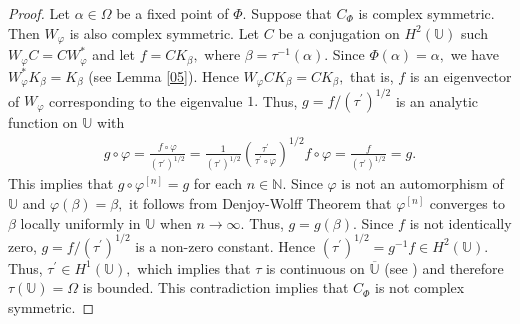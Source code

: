 \documentclass[11pt]{amsart}%
\theoremstyle{definition}
\theoremstyle{remark}
\numberwithin{equation}{section}
\begin{document}
\begin{proof}
Let $\alpha\in \Omega$ be a fixed point of $\Phi.$ Suppose that $C_{\Phi}$ is complex symmetric. Then
$W_{\varphi}$ is also complex symmetric. Let $C$ be a conjugation on
$H^{2}(\mathbb{U})$ such $W_{\varphi}C=CW_{\varphi}^{*}$ and let $f=CK_{\beta},$
where $\beta=\tau^{-1}(\alpha).$ Since $\Phi(\alpha)=\alpha,$ we have
$W_{\varphi}^{*}K_{\beta}=K_{\beta}$ (see Lemma \ref{05}). Hence $W_{\varphi
}CK_{\beta}=CK_{\beta},$ that is, $f$ is an eigenvector of $W_{\varphi}$
corresponding to the eigenvalue $1.$ Thus, $g=f/(\tau^{\prime})^{1/2}$ is an
analytic function on $\mathbb{U}$ with
\begin{align*}
g\circ\varphi=\frac{f\circ\varphi}{(\tau^{\prime})^{1/2}} =
\frac{1}{(\tau^{\prime})^{1/2}}\left(  \frac{\tau^{\prime}}{\tau^{\prime}%
\circ\varphi}\right)  ^{1/2} f\circ\varphi= \frac{f}{(\tau^{\prime})^{1/2}} =
g.
\end{align*}
This 
implies that $g\circ \varphi^{[n]}=g$ for each $n\in \mathbb{N}.$ Since
$\varphi$ is not an automorphism of $\mathbb{U}$ and $\varphi(\beta)=\beta,$
it follows from Denjoy-Wolff Theorem that $\varphi^{[n]}$ converges to $\beta$
locally uniformly in $\mathbb{U}$ when $n \rightarrow\infty.$ Thus, $g=g(\beta).$ Since $f$ is not identically
zero, $g=f/(\tau^{\prime})^{1/2}$ is a non-zero constant. Hence $(\tau
^{\prime})^{1/2}=g^{-1}f\in H^{2}(\mathbb{U}).$ Thus, $\tau^{\prime}\in
H^{1}(\mathbb{U}),$ which implies that $\tau$ is continuous on $\overline
{\mathbb{U}}$ (see \cite[Theorem 3]{Duren}) and therefore $\tau(\mathbb{U}%
)=\Omega$ is bounded. This contradiction implies that $C_{\Phi}$ is not
complex symmetric.
\end{proof}
\end{document}
